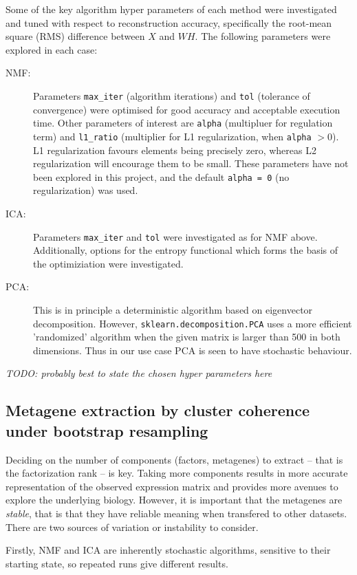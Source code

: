 \documentclass[draft,tikz, 12pt,a4paper,oneside,fleqn]{article}
\begin{document}
Some of the key algorithm hyper parameters of each method were investigated and tuned with respect to reconstruction accuracy, specifically the root-mean square (RMS) difference between $X$ and $W H$. The following parameters were explored in each case:
\begin{description}
\item[NMF:] Parameters {\tt max\_iter} (algorithm iterations) and {\tt tol} (tolerance of convergence) were optimised for good accuracy and acceptable execution time.  Other parameters of interest are {\tt alpha} (multipluer for regulation term) and {\tt l1\_ratio} (multiplier for L1 regularization, when {\tt alpha} $> 0$).  L1 regularization  favours elements being precisely zero, whereas L2 regularization will encourage them to be small.  These parameters have not been explored in this project, and the default {\tt alpha = 0} (no regularization) was used.
\item[ICA:]  Parameters {\tt max\_iter} and {\tt tol} were investigated as for NMF above.  Additionally, options for the entropy functional which forms the basis of the optimiziation were investigated.
\item[PCA:] This is in principle a deterministic algorithm based on eigenvector decomposition.  However, {\tt sklearn.decomposition.PCA} uses a more efficient 'randomized' algorithm when the given matrix is larger than 500 in both dimensions.  Thus in our use case PCA is seen to have stochastic behaviour.
\end{description}

\emph{TODO: probably best to state the chosen hyper parameters here}

\subsection{Metagene extraction by cluster coherence under bootstrap resampling}
\label{sec-metagene-selection}
Deciding on the number of components (factors, metagenes) to extract -- that is the factorization rank -- is key.  Taking more components results in more accurate representation of the observed expression matrix and provides more avenues to explore the underlying biology.  However, it is important that the metagenes are \emph{stable}, that is that they have reliable meaning when transfered to other datasets.   There are two sources of variation or instability to consider.

Firstly, NMF and ICA are inherently stochastic algorithms, sensitive to their starting state, so repeated runs give different results.
\end{document}
